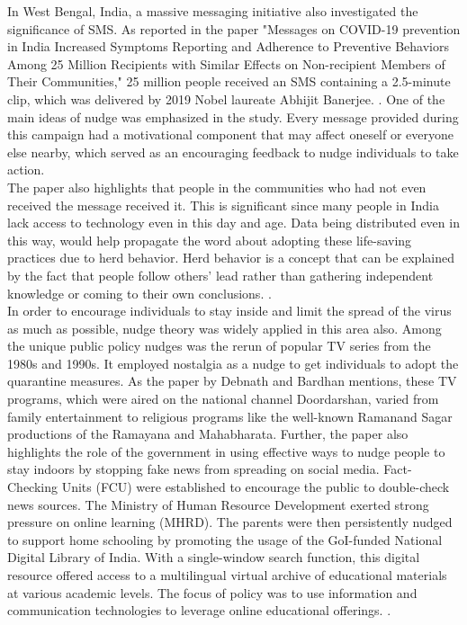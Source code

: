 \documentclass[12pt, a4paper]{article}
\begin{document}
In West Bengal, India, a massive messaging initiative also investigated the significance of SMS. As reported in the paper "Messages on COVID-19 prevention in India Increased Symptoms Reporting and Adherence to Preventive Behaviors Among 25 Million Recipients with Similar Effects on Non-recipient Members of Their Communities," 25 million people received an SMS containing a 2.5-minute clip, which was delivered by 2019 Nobel laureate Abhijit Banerjee. \citep{article2}. One of the main ideas of nudge was emphasized in the study. Every message provided during this campaign had a motivational component that may affect oneself or everyone else nearby, which served as an encouraging feedback to nudge individuals to take action.\\
The paper also highlights that people in the communities who had not even received the message received it. This is significant since many people in India lack access to technology even in this day and age. Data being
distributed even in this way, would help propagate the word about adopting these life-saving practices due to herd behavior. Herd behavior is a concept that can be explained by the fact that people follow others' lead rather than gathering independent knowledge or coming to their own conclusions. \citep{article10}.\\
In order to encourage individuals to stay inside and limit the spread of the virus as much as possible, nudge theory was widely applied in this area also. Among the unique public policy nudges was the rerun of popular TV series from the 1980s and 1990s. It employed nostalgia as a nudge to get individuals to adopt the quarantine measures. As the paper by Debnath and Bardhan \citep{article10} mentions, these TV programs, which were aired on the national channel Doordarshan, varied from family entertainment to religious programs like the well-known Ramanand Sagar productions of the Ramayana and Mahabharata. Further, the paper also highlights the role of the government in using effective ways to nudge people to stay indoors by stopping fake news from spreading on social media. Fact-Checking Units (FCU) were established to encourage the public to double-check news sources. The Ministry of Human Resource Development exerted strong pressure on online learning (MHRD). The parents were then persistently nudged to support home schooling by promoting the usage of the GoI-funded National Digital Library of India. With a single-window search function, this digital resource offered access to a multilingual virtual archive of educational materials at various academic levels. The focus of policy was to use information and communication technologies to leverage online educational offerings. \citep{article10}.\\
\end{document}
